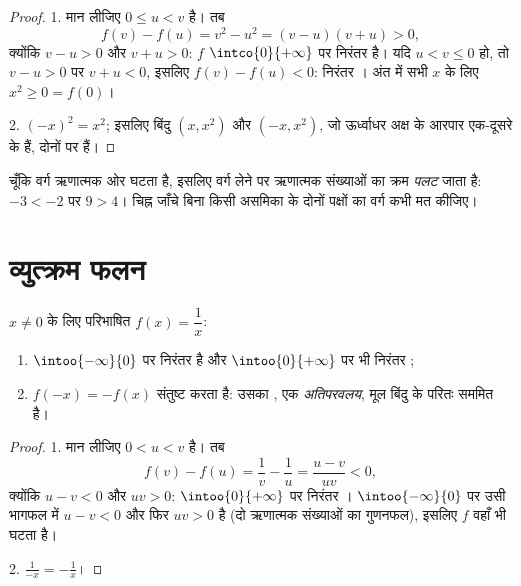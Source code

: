 \begin{proof}
1. मान लीजिए $0 \leq u < v$ है। तब
\[
f(v) - f(u) = v^2 - u^2 = (v - u)(v + u) > 0,
\]
क्योंकि $v - u > 0$ और $v + u > 0$: $f$ $\intco{0}{+\infty}$ पर निरंतर  है। यदि $u < v \leq 0$ हो, तो
$v - u > 0$ पर $v + u < 0$, इसलिए $f(v) - f(u) < 0$: निरंतर । अंत में सभी $x$ के लिए $x^2 \geq 0 = f(0)$।

2. $(-x)^2 = x^2$; इसलिए बिंदु $(x, x^2)$ और $(-x, x^2)$, जो ऊर्ध्वाधर अक्ष के आरपार एक-दूसरे के
 हैं, दोनों  पर हैं।
\end{proof}

\begin{remark}[वर्ग और क्रम]
चूँकि वर्ग  ऋणात्मक ओर घटता है, इसलिए वर्ग लेने पर ऋणात्मक संख्याओं का
क्रम \emph{पलट} जाता है: $-3 < -2$ पर $9 > 4$। चिह्न जाँचे बिना किसी असमिका के दोनों
पक्षों का वर्ग कभी मत कीजिए।
\end{remark}

\section{व्युत्क्रम फलन}

\begin{proposition}[व्युत्क्रम फलन]\label{prop:g10:reffunc:inverse}
$x \neq 0$ के लिए परिभाषित  $f(x) = \dfrac1x$:
\begin{enumerate}
  \item $\intoo{-\infty}{0}$ पर निरंतर  है और $\intoo{0}{+\infty}$ पर भी निरंतर ;
  \item $f(-x) = -f(x)$ संतुष्ट करता है: उसका , एक
        \emph{अतिपरवलय}, मूल बिंदु के परितः सममित है।
\end{enumerate}
\end{proposition}

\begin{proof}
1. मान लीजिए $0 < u < v$ है। तब
\[
f(v) - f(u) = \frac1v - \frac1u = \frac{u - v}{uv} < 0,
\]
क्योंकि $u - v < 0$ और $uv > 0$: $\intoo{0}{+\infty}$ पर निरंतर । $\intoo{-\infty}{0}$ पर उसी भागफल में $u - v < 0$
और फिर $uv > 0$ है (दो ऋणात्मक संख्याओं का गुणनफल), इसलिए $f$ वहाँ भी घटता है।

2. $\frac{1}{-x} = -\frac1x$।
\end{proof}

